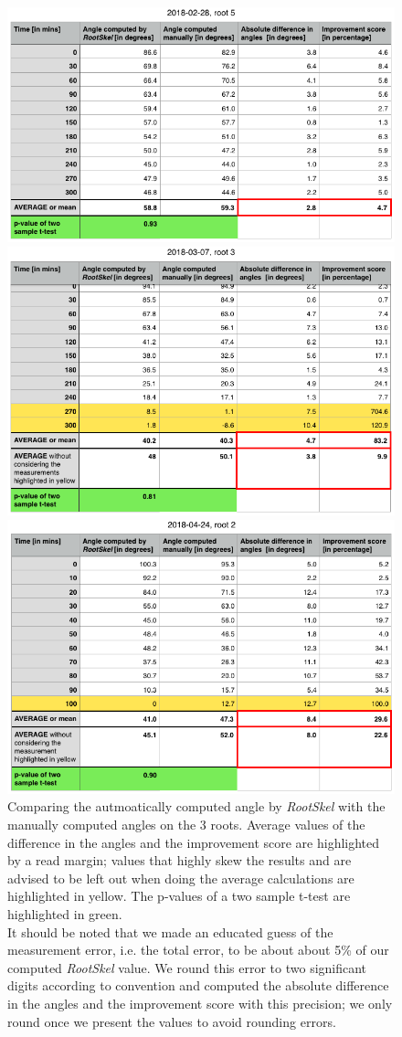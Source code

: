 \begin{figure}[h!]
	
	\centering
	
	\includegraphics[width=.7\textwidth]{../Figures/2018-02-28-stats-new.png}
	
	\includegraphics[width=.7\textwidth]{../Figures/2018-03-07-stats-new.png}
	
	\includegraphics[width=.7\textwidth]{../Figures/2018-04-24-stats-new.png}
	
	\caption{Comparing the autmoatically computed angle by \textit{RootSkel} with the manually computed angles on the 3 roots. Average values of the difference in the angles and the improvement score are highlighted by a read margin; values that highly skew the results and are advised to be left out when doing the average calculations are highlighted in yellow.
		The p-values of a two sample t-test are highlighted in green.\\ 
		It should be noted that we made an educated guess of the measurement error, i.e. the total error, to be about about 5\% of our computed \textit{RootSkel} value. We round this error to two significant digits according to convention and computed the absolute difference in the angles and the improvement score with this precision; we only round once we present the values to avoid rounding errors. }
	

\end{figure}
